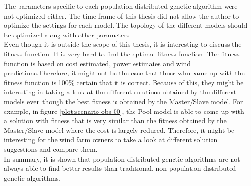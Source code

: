 \noindent The parameters specific to each population distributed genetic algorithm were not optimized either. The time frame of this thesis did not allow the author to optimize the settings for each model. The topology of the different models should be optimized along with other parameters.\\

\noindent Even though it is outside the scope of this thesis, it is interesting to discuss the fitness function. It is very hard to find the optimal fitness function. The fitness function is based on cost estimated, power estimates and wind predictions.Therefore, it might not be the case that those who came up with the fitness function is 100\% certain that it is correct. Because of this, they might be interesting in taking a look at the different solutions obtained by the different models even though the best fitness is obtained by the Master/Slave model. For example, in figure \ref{plot:scenario obs 00}, the Pool model is able to come up with a solution with fitness that is very similar than the fitness obtained by the Master/Slave model where the cost is largely reduced. Therefore, it might be interesting for the wind farm owners to take a look at different solution suggestions and compare them.\\

\noindent In summary, it is shown that population distributed genetic algorithms are not always able to find better results than traditional, non-population distributed genetic algorithms.\\


